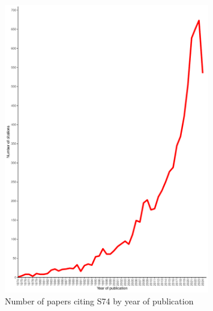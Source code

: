\documentclass[12pt]{article}  %
\begin{document}
\begin{figure}[!htp]
\begin{center}
\includegraphics[width = 0.8\textwidth]{S74_Citations.pdf}
\caption{Number of papers citing S74 by year of publication}
\label{figure:S74_Citations}
\end{center}
\end{figure}
\end{document}
